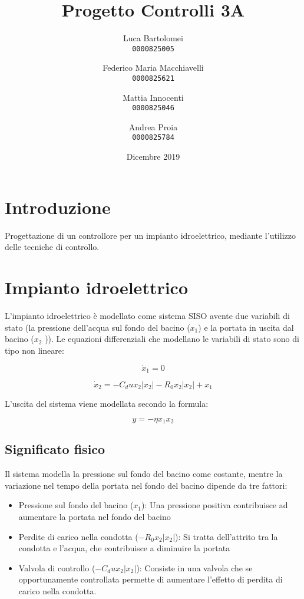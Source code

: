 \documentclass{article}
\title{Progetto Controlli 3A}
\author{
Luca Bartolomei\\
\texttt{0000825005}
\and
Federico Maria Macchiavelli\\
\texttt{0000825621}
\and
Mattia Innocenti\\
\texttt{0000825046}
\and
Andrea Proia\\
\texttt{0000825784}}
\date{Dicembre 2019}
\begin{document}
\maketitle

\section{Introduzione}

Progettazione di un controllore per un impianto idroelettrico, mediante l'utilizzo delle tecniche di controllo.

\section{Impianto idroelettrico}

L'impianto idroelettrico è modellato come sistema SISO avente due variabili di stato (la pressione  dell’acqua sul fondo del bacino ($x_1$) e la portata in uscita dal bacino ($x_2$ )). Le equazioni differenziali che modellano le variabili di stato sono di tipo non lineare:

$$
\dot{x}_1 = 0
$$

$$
\dot{x}_2 = -C_d u x_2 |x_2| -R_0 x_2 |x_2| + x_1
$$

L'uscita del sistema viene modellata secondo la formula:

$$
y=-\eta x_1 x_2
$$

\subsection{Significato fisico}

Il sistema modella la pressione sul fondo del bacino come costante, mentre la variazione nel tempo della portata nel fondo del bacino dipende da tre fattori:

\begin{itemize}
    \item Pressione sul fondo del bacino ($x_1$): Una pressione positiva contribuisce ad aumentare la portata nel fondo del bacino
    \item Perdite di carico nella condotta ($-R_0 x_2 |x_2|$): Si tratta dell'attrito tra la condotta e l'acqua, che contribuisce a diminuire la portata
    \item Valvola di controllo ($-C_d u x_2 |x_2|$): Consiste in una valvola che se opportunamente controllata permette di aumentare l'effetto di perdita di carico nella condotta.
\end{itemize}
\end{document}
